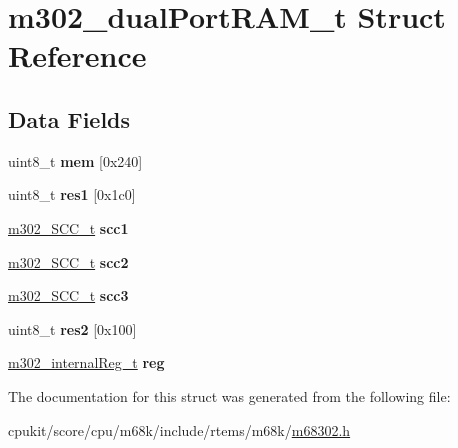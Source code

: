 \hypertarget{structm302__dualPortRAM__t}{}\section{m302\+\_\+dual\+Port\+R\+A\+M\+\_\+t Struct Reference}
\label{structm302__dualPortRAM__t}
\subsection*{Data Fields}
\begin{DoxyCompactItemize}
\item 
\mbox{\label{structm302__dualPortRAM__t_a52fc0c8d9ff886a2d92fff5a26a659e9}} 
uint8\+\_\+t {\bfseries mem} \mbox{[}0x240\mbox{]}
\item 
\mbox{\label{structm302__dualPortRAM__t_a2b28953c398d107adc9d73abdf3fd93e}} 
uint8\+\_\+t {\bfseries res1} \mbox{[}0x1c0\mbox{]}
\item 
\mbox{\label{structm302__dualPortRAM__t_a8f9c6032468c79c7e41fcc56fc7acfb2}} 
\mbox{\hyperlink{structm302__SCC__t}{m302\+\_\+\+S\+C\+C\+\_\+t}} {\bfseries scc1}
\item 
\mbox{\label{structm302__dualPortRAM__t_a4f769dccb57e9c8e64590fc06d158fea}} 
\mbox{\hyperlink{structm302__SCC__t}{m302\+\_\+\+S\+C\+C\+\_\+t}} {\bfseries scc2}
\item 
\mbox{\label{structm302__dualPortRAM__t_a2de5ab9eb56a4dc04835681efb6f4246}} 
\mbox{\hyperlink{structm302__SCC__t}{m302\+\_\+\+S\+C\+C\+\_\+t}} {\bfseries scc3}
\item 
\mbox{\label{structm302__dualPortRAM__t_ac86fa7200c5c81b327fc4efe30ec1769}} 
uint8\+\_\+t {\bfseries res2} \mbox{[}0x100\mbox{]}
\item 
\mbox{\label{structm302__dualPortRAM__t_a2aa0b08ce25d8473135498bcb1af51be}} 
\mbox{\hyperlink{structm302__internalReg__t}{m302\+\_\+internal\+Reg\+\_\+t}} {\bfseries reg}
\end{DoxyCompactItemize}


The documentation for this struct was generated from the following file\+:\begin{DoxyCompactItemize}
\item 
cpukit/score/cpu/m68k/include/rtems/m68k/\mbox{\hyperlink{m68302_8h}{m68302.\+h}}\end{DoxyCompactItemize}
